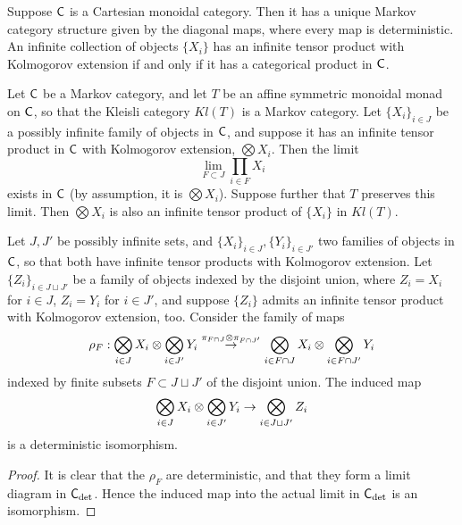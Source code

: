 \documentclass[11pt]{article}
\begin{document}
\begin{example}
    Suppose $\mathsf{C}$ is a Cartesian monoidal category. Then it has a unique Markov category structure given by the diagonal maps,
    where every map is deterministic.
    An infinite collection of objects $\{X_i\}$ has an infinite tensor product with Kolmogorov extension if and only if it has a categorical product in $\mathsf{C}$.
\end{example}

\begin{proposition}
    Let $\mathsf{C}$ be a Markov category, and let $T$ be an affine symmetric monoidal monad on $\mathsf{C}$, so that the Kleisli category $Kl(T)$ is a Markov category.
    Let $\{X_i\}_{i\in J}$ be a possibly infinite family of objects in $\mathsf{C}$, and suppose it has an infinite tensor product in $\mathsf{C}$ with Kolmogorov extension, $\bigotimes X_i$.
    Then the limit
    \[\lim_{F \subset J} \prod_{i\in F}X_i\]
    exists in $\mathsf{C}$ (by assumption, it is $\bigotimes X_i$).
    Suppose further that $T$ preserves this limit.
    Then $\bigotimes X_i$ is also an infinite tensor product of $\{X_i\}$ in $Kl(T)$.
\end{proposition}
\begin{lemma}
    Let $J,J'$ be possibly infinite sets, and $\{X_i\}_{i\in J}, \{Y_i\}_{i\in J'}$ two families of objects in $\mathsf{C}$, so that both have infinite tensor products with Kolmogorov extension.
    Let $\{Z_i\}_{i\in J \sqcup J'}$ be a family of objects indexed by the disjoint union, where $Z_i = X_i$ for $i\in J$, $Z_i = Y_i$ for $i \in J'$,
    and suppose $\{Z_i\}$ admits an infinite tensor product with Kolmogorov extension, too.
    Consider the family of maps
    \[\rho_F: \bigotimes_{i\in J}X_i \otimes \bigotimes_{i\in J'} Y_i \overset{\pi_{F \cap J} \otimes \pi_{F \cap J'}}{\to} \bigotimes_{i \in F \cap J}X_i \otimes \bigotimes_{i\in F \cap J'}Y_i\]
    indexed by finite subsets $F \subset J \sqcup J'$ of the disjoint union.
    The induced map
    \[\bigotimes_{i\in J}X_i \otimes \bigotimes_{i\in J'} Y_i \to \bigotimes_{i \in J \sqcup J'} Z_i\]
    is a deterministic isomorphism.
\end{lemma}
\begin{proof}
    It is clear that the $\rho_F$ are deterministic, and that they form a limit diagram in $\mathsf{C}_{\rm det}$.
    Hence the induced map into the actual limit in $\mathsf{C}_{\rm det}$ is an isomorphism.
\end{proof}
\end{document}
